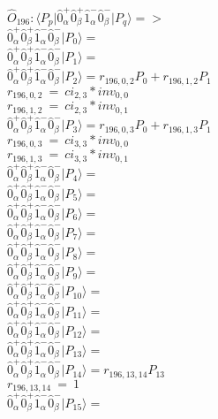 \documentclass[14pt]{article}
\begin{document}
    $\hat{O}_{196}:  \langle{P_p}\vert \hat{0}_{\alpha}^{+}\hat{0}_{\beta}^{+}\hat{1}_{\alpha}^{-}\hat{0}_{\beta}^{-} \vert{P_q}\rangle => $ \\ 
    $ \hat{0}_{\alpha}^{+}\hat{0}_{\beta}^{+}\hat{1}_{\alpha}^{-}\hat{0}_{\beta}^{-} \vert{P_{0}}\rangle =  $ \\ 
    $ \hat{0}_{\alpha}^{+}\hat{0}_{\beta}^{+}\hat{1}_{\alpha}^{-}\hat{0}_{\beta}^{-} \vert{P_{1}}\rangle =  $ \\ 
    $ \hat{0}_{\alpha}^{+}\hat{0}_{\beta}^{+}\hat{1}_{\alpha}^{-}\hat{0}_{\beta}^{-} \vert{P_{2}}\rangle = {r}_{196,0,2}P_{0}+{r}_{196,1,2}P_{1} $ \\ 
    ${r}_{196,0,2}\ =\ {ci}_{2,3}*{inv}_{0,0} $ \\ 
    ${r}_{196,1,2}\ =\ {ci}_{2,3}*{inv}_{0,1} $ \\ 
    $ \hat{0}_{\alpha}^{+}\hat{0}_{\beta}^{+}\hat{1}_{\alpha}^{-}\hat{0}_{\beta}^{-} \vert{P_{3}}\rangle = {r}_{196,0,3}P_{0}+{r}_{196,1,3}P_{1} $ \\ 
    ${r}_{196,0,3}\ =\ {ci}_{3,3}*{inv}_{0,0} $ \\ 
    ${r}_{196,1,3}\ =\ {ci}_{3,3}*{inv}_{0,1} $ \\ 
    $ \hat{0}_{\alpha}^{+}\hat{0}_{\beta}^{+}\hat{1}_{\alpha}^{-}\hat{0}_{\beta}^{-} \vert{P_{4}}\rangle =  $ \\ 
    $ \hat{0}_{\alpha}^{+}\hat{0}_{\beta}^{+}\hat{1}_{\alpha}^{-}\hat{0}_{\beta}^{-} \vert{P_{5}}\rangle =  $ \\ 
    $ \hat{0}_{\alpha}^{+}\hat{0}_{\beta}^{+}\hat{1}_{\alpha}^{-}\hat{0}_{\beta}^{-} \vert{P_{6}}\rangle =  $ \\ 
    $ \hat{0}_{\alpha}^{+}\hat{0}_{\beta}^{+}\hat{1}_{\alpha}^{-}\hat{0}_{\beta}^{-} \vert{P_{7}}\rangle =  $ \\ 
    $ \hat{0}_{\alpha}^{+}\hat{0}_{\beta}^{+}\hat{1}_{\alpha}^{-}\hat{0}_{\beta}^{-} \vert{P_{8}}\rangle =  $ \\ 
    $ \hat{0}_{\alpha}^{+}\hat{0}_{\beta}^{+}\hat{1}_{\alpha}^{-}\hat{0}_{\beta}^{-} \vert{P_{9}}\rangle =  $ \\ 
    $ \hat{0}_{\alpha}^{+}\hat{0}_{\beta}^{+}\hat{1}_{\alpha}^{-}\hat{0}_{\beta}^{-} \vert{P_{10}}\rangle =  $ \\ 
    $ \hat{0}_{\alpha}^{+}\hat{0}_{\beta}^{+}\hat{1}_{\alpha}^{-}\hat{0}_{\beta}^{-} \vert{P_{11}}\rangle =  $ \\ 
    $ \hat{0}_{\alpha}^{+}\hat{0}_{\beta}^{+}\hat{1}_{\alpha}^{-}\hat{0}_{\beta}^{-} \vert{P_{12}}\rangle =  $ \\ 
    $ \hat{0}_{\alpha}^{+}\hat{0}_{\beta}^{+}\hat{1}_{\alpha}^{-}\hat{0}_{\beta}^{-} \vert{P_{13}}\rangle =  $ \\ 
    $ \hat{0}_{\alpha}^{+}\hat{0}_{\beta}^{+}\hat{1}_{\alpha}^{-}\hat{0}_{\beta}^{-} \vert{P_{14}}\rangle = {r}_{196,13,14}P_{13} $ \\ 
    ${r}_{196,13,14}\ =\ 1 $ \\ 
    $ \hat{0}_{\alpha}^{+}\hat{0}_{\beta}^{+}\hat{1}_{\alpha}^{-}\hat{0}_{\beta}^{-} \vert{P_{15}}\rangle =  $ \\ 
    
\end{document}
